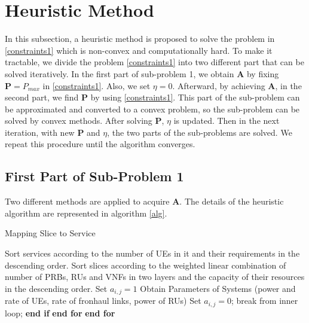 \documentclass[conference]{IEEEtran}
\begin{document}
\section{Heuristic Method}\label{proposedmethod}
In this subsection, a heuristic  method is proposed to solve the problem in \eqref{constraints1} which is non-convex and computationally hard. To make it tractable, we divide the problem \eqref{constraints1} into
two different part that can be solved iteratively.
In the first part of sub-problem 1, we obtain $\boldsymbol{A}$ by fixing $\boldsymbol{P} = P_{max}$ in \eqref{constraints1}. Also, we set $\eta = 0$. Afterward, by achieving $\boldsymbol{A}$, in the second part, we find $\boldsymbol{P}$ by using \eqref{constraints1}. This part of the sub-problem can be approximated and converted to a convex problem, so the sub-problem can be solved by convex methods. After solving $\boldsymbol{P}$, $\eta$ is updated. Then in the next iteration, with new $\boldsymbol{P}$
and $\eta$, the two parts of the sub-problems are solved. We repeat this procedure until the algorithm  converges.
\subsection{First Part of Sub-Problem 1}\label{firstsub}
Two different methods are applied to acquire $\boldsymbol{A}$.
The details of the heuristic algorithm are represented in algorithm \ref{alg}.
\begin{algorithm}
\caption{Mapping Slice to Service}\label{alg}
\begin{algorithmic}[1]
\State Sort services according to the number of UEs in it and their requirements in the descending order.
\State Sort slices according to the weighted linear combination of number of PRBs, RUs and VNFs in two layers and the capacity of their resources in the descending order.
\State Set $a_{i,j} = 1$
\State Obtain Parameters of Systems (power and rate of UEs, rate of fronhaul links, power of RUs)
\State Set $a_{i,j} = 0$;
\Else
\State break from inner loop;
\EndIf
\State \textbf{end if}
\EndFor
\State \textbf{end for}
\EndFor
\State \textbf{end for}
\end{algorithmic}
\end{algorithm}
\end{document}
